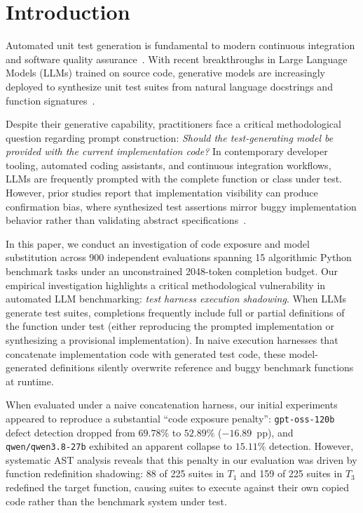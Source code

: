 \documentclass[11pt,a4paper]{article}
\begin{document}
\section{Introduction}
\label{sec:intro}

Automated unit test generation is fundamental to modern continuous integration and software quality assurance~\cite{fraser2011evosuite,barr2015oracle}. With recent breakthroughs in Large Language Models (LLMs) trained on source code, generative models are increasingly deployed to synthesize unit test suites from natural language docstrings and function signatures~\cite{chen2021humaneval,lemieux2023codamosa,schafer2024testpilot,alshahwan2024automated,pizzorno2025coverup}. 

Despite their generative capability, practitioners face a critical methodological question regarding prompt construction: \textit{Should the test-generating model be provided with the current implementation code?} In contemporary developer tooling, automated coding assistants, and continuous integration workflows, LLMs are frequently prompted with the complete function or class under test. However, prior studies report that implementation visibility can produce confirmation bias, where synthesized test assertions mirror buggy implementation behavior rather than validating abstract specifications~\cite{huang2024measuring,konstantinou2026codingbeforetesting,zhao2026misguidance}.

In this paper, we conduct an investigation of code exposure and model substitution across 900 independent evaluations spanning 15 algorithmic Python benchmark tasks under an unconstrained 2048-token completion budget. Our empirical investigation highlights a critical methodological vulnerability in automated LLM benchmarking: \textit{test harness execution shadowing}. When LLMs generate test suites, completions frequently include full or partial definitions of the function under test (either reproducing the prompted implementation or synthesizing a provisional implementation). In naive execution harnesses that concatenate implementation code with generated test code, these model-generated definitions silently overwrite reference and buggy benchmark functions at runtime.

When evaluated under a naive concatenation harness, our initial experiments appeared to reproduce a substantial ``code exposure penalty'': \texttt{gpt-oss-120b} defect detection dropped from $69.78\%$ to $52.89\%$ ($-16.89$~pp), and \texttt{qwen/qwen3.8-27b} exhibited an apparent collapse to $15.11\%$ detection. However, systematic AST analysis reveals that this penalty in our evaluation was driven by function redefinition shadowing: 88 of 225 suites in $T_1$ and 159 of 225 suites in $T_3$ redefined the target function, causing suites to execute against their own copied code rather than the benchmark system under test.
\end{document}
